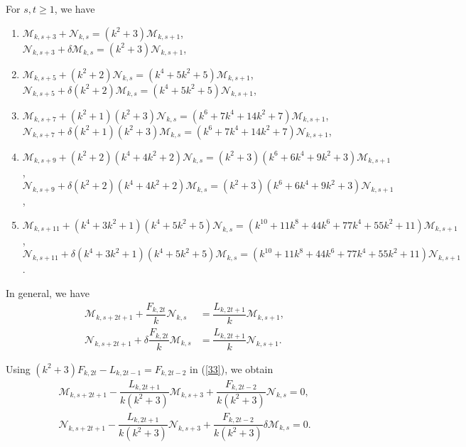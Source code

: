 \begin{theorem}For $s, t\geq 1$, we have\label{3.16}
\begin{enumerate}
\item $\mathcal{M}_{k,s+3}+\mathcal{N}_{k,s}=(k^2+3)\mathcal{M}_{k,s+1}$,\\
$\mathcal{N}_{k,s+3}+\delta\mathcal{M}_{k,s}=(k^2+3)\mathcal{N}_{k,s+1}$,
\item $\mathcal{M}_{k,s+5}+(k^2+2)\mathcal{N}_{k,s}=(k^4+5k^2+5)\mathcal{M}_{k,s+1}$,\\
$\mathcal{N}_{k,s+5}+\delta(k^2+2)\mathcal{M}_{k,s}=(k^4+5k^2+5)\mathcal{N}_{k,s+1}$,
\item $\mathcal{M}_{k,s+7}+(k^2+1)(k^2+3)\mathcal{N}_{k,s}=(k^6+7k^4+14k^2+7)\mathcal{M}_{k,s+1}$,\\
$\mathcal{N}_{k,s+7}+\delta(k^2+1)(k^2+3)\mathcal{M}_{k,s}=(k^6+7k^4+14k^2+7)\mathcal{N}_{k,s+1}$,
\item $\mathcal{M}_{k,s+9}+(k^2+2)(k^4+4k^2+2)\mathcal{N}_{k,s}=(k^2+3)(k^6+6k^4+9k^2+3)\mathcal{M}_{k,s+1}$,\\
$\mathcal{N}_{k,s+9}+\delta(k^2+2)(k^4+4k^2+2)\mathcal{M}_{k,s}=(k^2+3)(k^6+6k^4+9k^2+3)\mathcal{N}_{k,s+1}$,
\item $\mathcal{M}_{k,s+11}+(k^4+3k^2+1)(k^4+5k^2+5)\mathcal{N}_{k,s}=(k^{10}+11k^8+44k^6+77k^4+55k^2+11)\mathcal{M}_{k,s+1}$,\\
$\mathcal{N}_{k,s+11}+\delta(k^4+3k^2+1)(k^4+5k^2+5)\mathcal{M}_{k,s}=(k^{10}+11k^8+44k^6+77k^4+55k^2+11)\mathcal{N}_{k,s+1}$.
\end{enumerate}
In general, we have
\begin{align}\label{33}
\mathcal{M}_{k,s+2t+1}+\dfrac{F_{k,2t}}{k}\mathcal{N}_{k,s}&=\dfrac{L_{k,2t+1}}{k}\mathcal{M}_{k,s+1},\\
\mathcal{N}_{k,s+2t+1}+\delta\dfrac{F_{k,2t}}{k}\mathcal{M}_{k,s}&=\dfrac{L_{k,2t+1}}{k}\mathcal{N}_{k,s+1}.
\end{align}
\end{theorem}
\begin{remark}
Using $(k^2+3)F_{k,2t}-L_{k,2t-1}=F_{k,2t-2}$ in (\ref{33}), we obtain
\begin{align*}
\mathcal{M}_{k,s+2t+1}-\dfrac{L_{k,2t+1}}{k(k^2+3)}\mathcal{M}_{k,s+3}+\dfrac{F_{k,2t-2}}{k(k^2+3)}\mathcal{N}_{k,s}=0,\\
\mathcal{N}_{k,s+2t+1}-\dfrac{L_{k,2t+1}}{k(k^2+3)}\mathcal{N}_{k,s+3}+\dfrac{F_{k,2t-2}}{k(k^2+3)}\delta\mathcal{M}_{k,s}=0.
\end{align*}
\end{remark}
